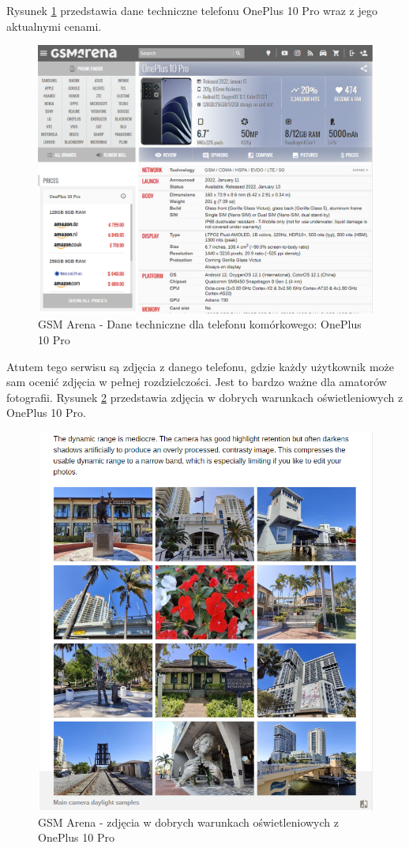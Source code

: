 Rysunek \ref*{GSM_Arena_1} przedstawia dane techniczne telefonu OnePlus 10 Pro wraz z jego aktualnymi cenami.
\begin{figure}[H]
    \centering
    \includegraphics[scale=0.38]{img/GSM Arena/DetailsPageWithPrices.png}
    \caption{GSM Arena - Dane techniczne dla telefonu komórkowego: OnePlus 10 Pro}
    \label{GSM_Arena_1}
\end{figure}
Atutem tego serwisu są zdjęcia z danego telefonu, gdzie każdy użytkownik może sam ocenić zdjęcia w pełnej rozdzielczości. Jest to bardzo ważne dla amatorów fotografii. Rysunek \ref*{GSM_Arena_2} przedstawia zdjęcia w dobrych warunkach oświetleniowych z OnePlus 10 Pro. 
\begin{figure}[H]
    \centering
    \includegraphics[scale=0.76]{img/GSM Arena/ReviewWithPhotos.png}
    \caption{GSM Arena - zdjęcia w dobrych warunkach oświetleniowych z OnePlus 10 Pro}
    \label{GSM_Arena_2}
\end{figure}
